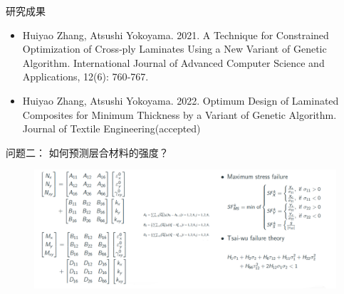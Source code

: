 \documentclass{beamer}
\begin{document}


\begin{frame}{研究成果}
	\begin{center}
		\begin{itemize}
			\item Huiyao Zhang, Atsushi Yokoyama. 2021. A Technique for Constrained Optimization of Cross‑ply Laminates Using a New
				Variant of Genetic Algorithm. International Journal of Advanced Computer Science and Applications, 12(6): 760‑767.
			\item Huiyao Zhang, Atsushi Yokoyama. 2022. Optimum Design of Laminated Composites for Minimum Thickness by a Variant
				of Genetic Algorithm. Journal of Textile Engineering(accepted)
		\end{itemize}
	\end{center}
\end{frame}





\begin{frame}{问题二： 如何预测层合材料的强度？ }
	\begin{center}
		\begin{figure}
			\includegraphics[width=1\textwidth]{fig/part3/formula_for_stenght_calculation.png}
		\end{figure}
	\end{center}
\end{frame}
\end{document}

